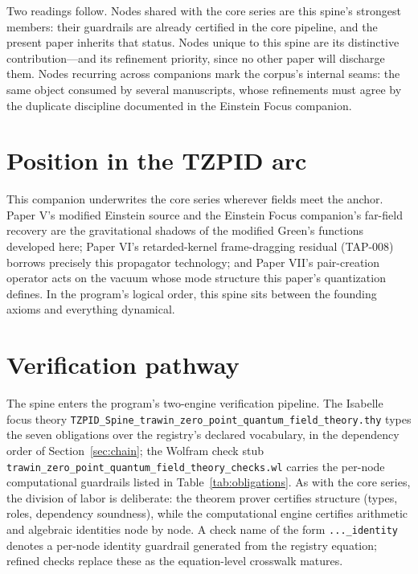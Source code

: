 \documentclass[11pt]{article}
\theoremstyle{remark}
\begin{document}
Two readings follow. Nodes shared with the core series are this spine's strongest members: their guardrails are already certified in the core pipeline, and the present paper inherits that status. Nodes unique to this spine are its distinctive contribution---and its refinement priority, since no other paper will discharge them. Nodes recurring across companions mark the corpus's internal seams: the same object consumed by several manuscripts, whose refinements must agree by the duplicate discipline documented in the Einstein Focus companion.

\section{Position in the TZPID arc}
\label{sec:arc}

This companion underwrites the core series wherever fields meet the anchor. Paper V's modified Einstein source and the Einstein Focus companion's far-field recovery are the gravitational shadows of the modified Green's functions developed here; Paper VI's retarded-kernel frame-dragging residual (TAP-008) borrows precisely this propagator technology; and Paper VII's pair-creation operator acts on the vacuum whose mode structure this paper's quantization defines. In the program's logical order, this spine sits between the founding axioms and everything dynamical.

\section{Verification pathway}
\label{sec:verify}

The spine enters the program's two-engine verification pipeline. The Isabelle focus theory \texttt{TZPID\_Spine\_trawin\_zero\_point\_quantum\_field\_theory.thy} types the seven obligations over the registry's declared vocabulary, in the dependency order of Section~\ref{sec:chain}; the Wolfram check stub \texttt{trawin\_zero\_point\_quantum\_field\_theory\_checks.wl} carries the per-node computational guardrails listed in Table~\ref{tab:obligations}. As with the core series, the division of labor is deliberate: the theorem prover certifies structure (types, roles, dependency soundness), while the computational engine certifies arithmetic and algebraic identities node by node. A check name of the form \texttt{...\_identity} denotes a per-node identity guardrail generated from the registry equation; refined checks replace these as the equation-level crosswalk matures.
\end{document}
